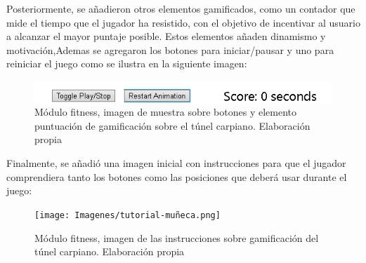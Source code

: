 Posteriormente, se añadieron otros elementos gamificados, como un contador que mide el tiempo que el jugador ha resistido, con el objetivo de incentivar al usuario a alcanzar el mayor puntaje posible. Estos elementos añaden dinamismo y motivación,Ademas se agregaron los botones para iniciar/pausar  y uno para reiniciar el juego como se ilustra en la siguiente imagen:

\begin{figure}[H]
  \centering
  \includegraphics[width=0.6\linewidth]{Imagenes/Fitness2.png}
  \caption{Módulo fitness, imagen de muestra sobre botones y elemento puntuación de gamificación sobre el túnel carpiano. Elaboración propia}
  \label{fig:imagen2fitness}
\end{figure}

Finalmente, se añadió una imagen inicial con instrucciones para que el jugador comprendiera tanto los botones como las posiciones que deberá usar durante el juego:
\begin{figure}[H]
  \centering
  \texttt{[image: Imagenes/tutorial-muñeca.png]}
  \caption{Módulo fitness, imagen de las instrucciones sobre gamificación del túnel carpiano. Elaboración propia}
  \label{fig:imagen3fitness}
\end{figure}



